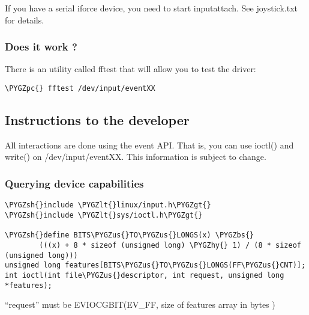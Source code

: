 \documentclass[a4paper,8pt,english]{sphinxmanual}
\def\PYGZbs{\char`\\}
\def\PYGZus{\char`\_}
\def\PYGZlt{\char`\<}
\def\PYGZgt{\char`\>}
\def\PYGZsh{\char`\#}
\def\PYGZpc{\char`\%}
\def\PYGZhy{\char`\-}
\begin{document}
If you have a serial iforce device, you need to start inputattach. See
joystick.txt for details.


\subsubsection{Does it work ?}
\label{input/ff:does-it-work}
There is an utility called fftest that will allow you to test the driver:

\begin{Verbatim}[commandchars=\\\{\}]
\PYGZpc{} fftest /dev/input/eventXX
\end{Verbatim}


\subsection{Instructions to the developer}
\label{input/ff:instructions-to-the-developer}
All interactions are done using the event API. That is, you can use ioctl()
and write() on /dev/input/eventXX.
This information is subject to change.


\subsubsection{Querying device capabilities}
\label{input/ff:querying-device-capabilities}
\begin{Verbatim}[commandchars=\\\{\}]
\PYGZsh{}include \PYGZlt{}linux/input.h\PYGZgt{}
\PYGZsh{}include \PYGZlt{}sys/ioctl.h\PYGZgt{}

\PYGZsh{}define BITS\PYGZus{}TO\PYGZus{}LONGS(x) \PYGZbs{}
        (((x) + 8 * sizeof (unsigned long) \PYGZhy{} 1) / (8 * sizeof (unsigned long)))
unsigned long features[BITS\PYGZus{}TO\PYGZus{}LONGS(FF\PYGZus{}CNT)];
int ioctl(int file\PYGZus{}descriptor, int request, unsigned long *features);
\end{Verbatim}

``request'' must be EVIOCGBIT(EV\_FF, size of features array in bytes )
\end{document}
